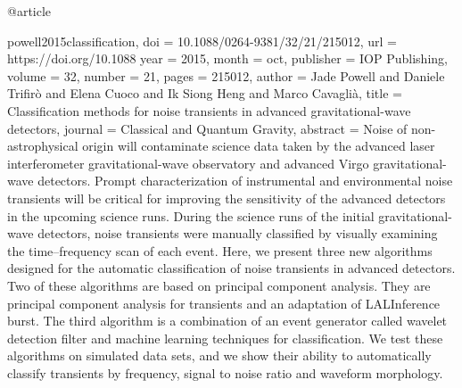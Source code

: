 {{{@article{powell2015classification,
	doi = {10.1088/0264-9381/32/21/215012},
	url = {https://doi.org/10.1088%
	year = 2015,
	month = {oct},
	publisher = {{IOP} Publishing},
	volume = {32},
	number = {21},
	pages = {215012},
	author = {Jade Powell and Daniele Trifir{\`{o}} and Elena Cuoco and Ik Siong Heng and Marco Cavagli{\`{a}}},
	title = {Classification methods for noise transients in advanced gravitational-wave detectors},
	journal = {Classical and Quantum Gravity},
	abstract = {Noise of non-astrophysical origin will contaminate science data taken by the advanced laser interferometer gravitational-wave observatory and advanced Virgo gravitational-wave detectors. Prompt characterization of instrumental and environmental noise transients will be critical for improving the sensitivity of the advanced detectors in the upcoming science runs. During the science runs of the initial gravitational-wave detectors, noise transients were manually classified by visually examining the time–frequency scan of each event. Here, we present three new algorithms designed for the automatic classification of noise transients in advanced detectors. Two of these algorithms are based on principal component analysis. They are principal component analysis for transients and an adaptation of LALInference burst. The third algorithm is a combination of an event generator called wavelet detection filter and machine learning techniques for classification. We test these algorithms on simulated data sets, and we show their ability to automatically classify transients by frequency, signal to noise ratio and waveform morphology.}
}

}}}}
